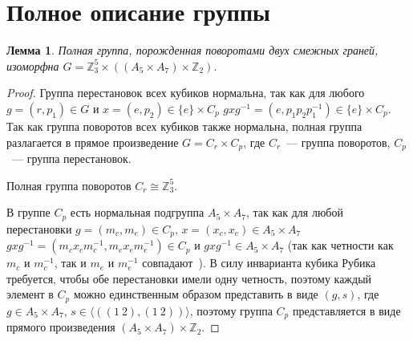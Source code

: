 \documentclass[utf8,a4paper,12pt]{article}
\newtheorem{lemma_cub}{Лемма}[section]
\begin{document}
\section{Полное описание группы}
\begin{lemma_cub}
Полная группа, порожденная поворотами двух смежных граней, изоморфна $G=\mathbb{Z}_3^5\times ((A_5\times A_7)\times\mathbb{Z}_2)$.
\end{lemma_cub}
\begin{proof}
Группа перестановок всех кубиков нормальна, так как для любого $g=(r,p_1)\in G$ и $x=(e,p_2)\in \{e\}\times C_p$ $gxg^{-1}=(e,p_1p_2p_1^{-1})\in \{e\}\times C_p$. Так как группа поворотов всех кубиков также нормальна, полная группа разлагается в прямое произведение $G=C_r\times C_p$, где $C_r$~--- группа поворотов, $C_p$~--- группа перестановок. 

Полная группа поворотов $C_r\cong \mathbb{Z}_3^5$.

В группе $C_p$ есть нормальная подгруппа $A_5\times A_7$, так как для любой перестановки $g=(m_c,m_e)\in C_p$, $x=(x_c,x_e)\in A_5\times A_7$ $gxg^{-1}=(m_cx_cm_c^{-1},m_ex_em_e^{-1})\in C_p$ и $gxg^{-1}\in A_5\times A_7$ (так как четности как $m_c$ и $m_c^{-1}$, так и $m_e$ и $m_e^{-1}$ совпадают~\cite{alexeev}). В силу инварианта кубика Рубика требуется, чтобы обе перестановки имели одну четность, поэтому каждый элемент в $C_p$ можно единственным образом представить в виде $(g,s)$, где $g\in A_5\times A_7$, $s\in \langle((1~2),(1~2))\rangle$, поэтому группа $C_p$ представляется в виде прямого произведения $(A_5\times A_7)\times\mathbb{Z}_2$.
\end{proof}
{}

\end{document}
